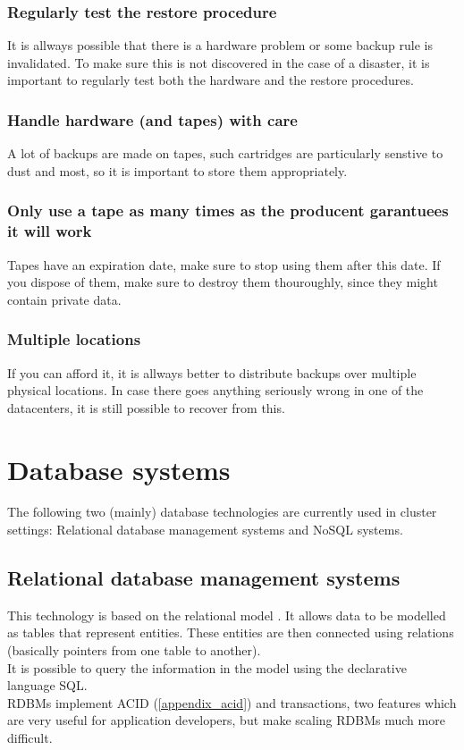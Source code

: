 \documentclass[12pt]{report}
\begin{document}
\subsubsection{Regularly test the restore procedure}
It is allways possible that there is a hardware problem or some backup
rule is invalidated. To make sure this is not discovered in the case
of a disaster, it is important to regularly test both the hardware and
the restore procedures.

\subsubsection{Handle hardware (and tapes) with care}
A lot of backups are made on tapes, such cartridges are particularly
senstive to dust and most, so it is important to store them
appropriately.

\subsubsection{Only use a tape as many times as the producent
  garantuees it will work}
Tapes have an expiration date, make sure to stop using them after this
date. If you dispose of them, make sure to destroy them thouroughly,
since they might contain private data.

\subsubsection{Multiple locations}
If you can afford it, it is allways better to distribute backups over
multiple physical locations. In case there goes anything seriously
wrong in one of the datacenters, it is still possible to recover from
this.

\section{Database systems}
The following two (mainly) database technologies are currently used in cluster
settings: Relational database management systems and NoSQL systems.

\subsection{Relational database management systems}
This technology is based on the relational model \cite{codd}. It
allows data to be modelled as tables that represent entities. These
entities are then connected using relations (basically pointers from
one table to another).\\
It is possible to query the information in the model using the
declarative language SQL.\\
RDBMs implement ACID
(\ref{appendix_acid}) and transactions, two features which are very
useful for application developers, but make scaling RDBMs much more difficult.
\end{document}
